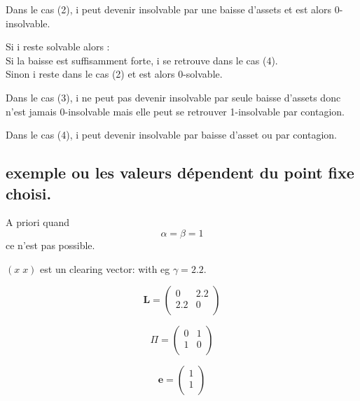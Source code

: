 \documentclass[11pt,oneside,twocolumn]{article}
\begin{document}
Dans le cas (2), i peut devenir insolvable par une baisse d'assets et est alors 0-insolvable.

Si i reste solvable alors :\\
Si la baisse est suffisamment forte, i se retrouve dans le cas (4).\\
Sinon i reste dans le cas (2) et est alors 0-solvable.

Dans le cas (3), i ne peut pas devenir insolvable par seule baisse d'assets donc n'est jamais 0-insolvable mais elle peut se retrouver 1-insolvable par contagion.

Dans le cas (4), i peut devenir insolvable par baisse d'asset ou par contagion.


\subsection{exemple ou les valeurs dépendent du point fixe choisi.}

A priori quand $$\alpha=\beta=1$$ ce n'est pas possible.

$(x\; x)$ est un clearing vector:
with eg $\gamma=2.2$.  

\begin{equation*}
\textbf{L} = 
\begin{pmatrix}
0 & 2.2 \\
2.2 & 0 \\
\end{pmatrix}
\end{equation*}

\begin{equation*}
\Pi = 
\begin{pmatrix}
0 & 1 \\
1 & 0 \\
\end{pmatrix}
\end{equation*}

\begin{equation*}
\textbf{e} = 
\begin{pmatrix}
1 \\
1 \\
\end{pmatrix}
\end{equation*}
\end{document}
